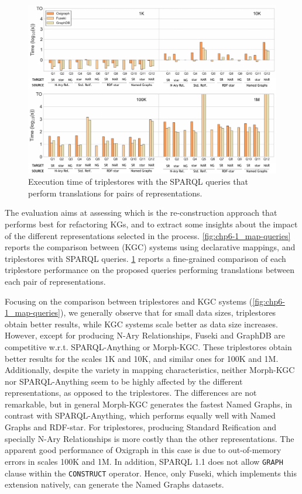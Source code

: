 \begin{figure}[t!]
    \centering
    \includegraphics[width=\linewidth]{figures/chp6-1_results-queries.pdf}
    \caption[Execution times of KG re-construction in triplestores]{Execution time of triplestores with the SPARQL queries that perform translations for pairs of representations.}
    \label{fig:chp6-1_queries}
\end{figure}

The evaluation aims at assessing which is the re-construction approach that performs best for refactoring KGs, and to extract some insights about the impact of the different representations selected in the process. \cref{fig:chp6-1_map-queries} reports the comparison between (KGC) systems using declarative mappings, and triplestores with SPARQL queries. 
\cref{fig:chp6-1_queries} reports a fine-grained comparison of each triplestore performance on the proposed queries performing translations between each pair of representations.

Focusing on the comparison between triplestores and KGC systems (\cref{fig:chp6-1_map-queries}), we generally observe that for small data sizes, triplestores obtain better results, while KGC systems scale better as data size increases. 
However, except for producing N-Ary Relationships, Fuseki and GraphDB are competitive w.r.t. SPARQL-Anything or Morph-KGC. These triplestores obtain better results for the scales 1K and 10K, and similar ones for 100K and 1M. 
Additionally, despite the variety in mapping characteristics, neither Morph-KGC nor SPARQL-Anything seem to be highly affected by the different representations, as opposed to the triplestores. 
The differences are not remarkable, but in general Morph-KGC generates the fastest Named Graphs, in contrast with SPARQL-Anything, which performs equally well with Named Graphs and RDF-star. 
For triplestores, producing Standard Reification and specially N-Ary Relationships is more costly than the other representations. The apparent good performance of Oxigraph in this case is due to out-of-memory errors in scales 100K and 1M.
In addition, SPARQL 1.1 does not allow \texttt{GRAPH} clause within the \texttt{CONSTRUCT} operator. Hence, only Fuseki, which implements this extension natively, can generate the Named Graphs datasets.

